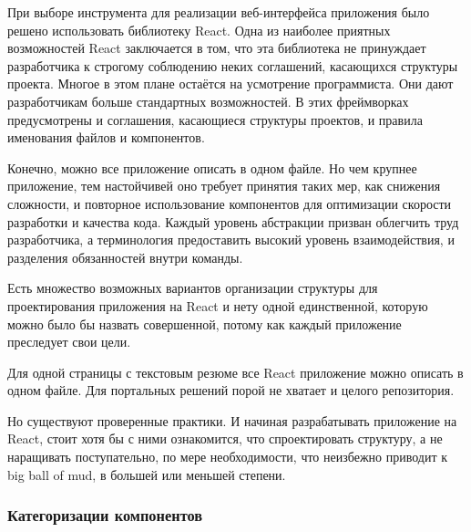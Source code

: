 При выборе инструмента для реализации веб-интерфейса приложения было решено использовать библиотеку React.
Одна из наиболее приятных возможностей React заключается в том, что эта библиотека не принуждает разработчика к строгому соблюдению неких соглашений, касающихся структуры проекта.
Многое в этом плане остаётся на усмотрение программиста.
Они дают разработчикам больше стандартных возможностей.
В этих фреймворках предусмотрены и соглашения, касающиеся структуры проектов, и правила именования файлов и компонентов.

Конечно, можно все приложение описать в одном файле.
Но чем крупнее приложение, тем настойчивей оно требует принятия таких мер, как снижения сложности, и повторное использование компонентов для оптимизации скорости разработки и качества кода.
Каждый уровень абстракции призван облегчить труд разработчика, а терминология предоставить высокий уровень взаимодействия, и разделения обязанностей внутри команды.

Есть множество возможных вариантов организации структуры для проектирования приложения на React и нету одной единственной, которую можно было бы назвать совершенной, потому как каждый приложение преследует свои цели.

Для одной страницы с текстовым резюме все React приложение можно описать в одном файле. Для портальных решений порой не хватает и целого репозитория.

Но существуют проверенные практики.
И начиная разрабатывать приложение на React, стоит хотя бы с ними ознакомится, что спроектировать структуру, а не наращивать поступательно, по мере необходимости, что неизбежно приводит к big ball of mud, в большей или меньшей степени.

\subsubsection{Категоризации компонентов}

